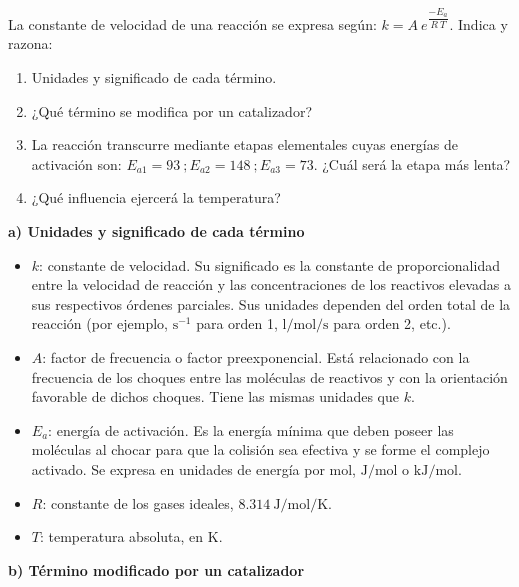 \begin{exercise}
    La constante de velocidad de una reacción se expresa según: \(k = A\ e^{\dfrac{-E_a}{R\ T}}\).
    Indica y razona:
    \begin{enumerate}[label=\letraminuscula]
        \item Unidades y significado de cada término.
        \item ¿Qué término se modifica por un catalizador?
        \item La reacción transcurre mediante etapas elementales cuyas energías de activación son: \(E_{a1} = 93\ ; E_{a2} = 148\ ; E_{a3} = 73\).
        ¿Cuál será la etapa más lenta?
        \item ¿Qué
        influencia ejercerá la temperatura?
    \end{enumerate}

    \begin{solu}

        \textbf{a) Unidades y significado de cada término}

        \begin{itemize}
            \item \(k\): constante de velocidad. Su significado es la constante de proporcionalidad entre la velocidad de reacción y las concentraciones de los reactivos elevadas a sus respectivos órdenes parciales. Sus unidades dependen del orden total de la reacción (por ejemplo, \(\si{\s^{-1}}\) para orden 1, \(\si{\litre\per\mole\per\s}\) para orden 2, etc.).
            \item \(A\): factor de frecuencia o factor preexponencial. Está relacionado con la frecuencia de los choques entre las moléculas de reactivos y con la orientación favorable de dichos choques. Tiene las mismas unidades que \(k\).
            \item \(E_a\): energía de activación. Es la energía mínima que deben poseer las moléculas al chocar para que la colisión sea efectiva y se forme el complejo activado. Se expresa en unidades de energía por mol, \(\si{\joule\per\mole}\) o \(\si{\kilo\joule\per\mole}\).
            \item \(R\): constante de los gases ideales, \(\SI{8.314}{\joule\per\mole\per\kelvin}\).
            \item \(T\): temperatura absoluta, en \(\si{\kelvin}\).
        \end{itemize}

        \textbf{b) Término modificado por un catalizador}


\end{solu}
\end{exercise}
